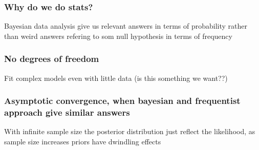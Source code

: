 \documentclass{beamer}
\begin{document}
 
  \begin{frame}
  \frametitle{\bf Why do we do stats?}
  
  Bayesian data analysis give us relevant answers in terms of probability rather than weird answers refering to som null hypothesis in
  terms of frequency
  
 \end{frame}
 
  \begin{frame}
  \frametitle{\bf No degrees of freedom}
  
  Fit complex models even with little data (is this something we want??)
  
 \end{frame}
 
  \begin{frame}
  \frametitle{\bf Asymptotic convergence, when bayesian and frequentist approach give similar answers}
  
  With infinite sample size the posterior distribution just reflect the likelihood, as sample size increases
  priors have dwindling effects
  
 \end{frame}
 
\end{document}
